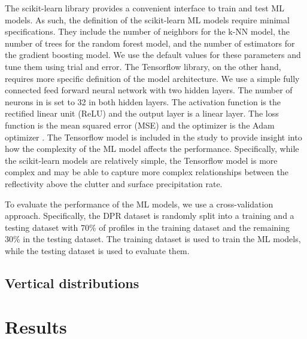 \documentclass{article}
\begin{document}
The scikit-learn library provides a convenient interface to train and
test ML models.  As such, the definition of the scikit-learn ML models
require minimal specifications. They include the number of neighbors
for the k-NN model, the number of trees for the random forest model,
and the number of estimators for the gradient boosting model.  We use
the default values for these parameters and tune them using 
trial and error.  The Tensorflow library, on the other hand, requires
more specific definition of the model architecture.  We use a simple 
fully connected feed forward neural network with two hidden layers. 
The number of neurons in is set to 32 in both hidden layers.  The
activation function is the rectified linear unit (ReLU) \citep{relu2010}
and the output layer is a linear layer.  The loss function is the mean
squared error (MSE) and the optimizer is the Adam optimizer 
\citep{adam2014}. The Tensorflow model is included in the study to
provide insight into how the complexity of the ML model affects the
performance.  Specifically, while the scikit-learn models are relatively
simple, the Tensorflow model is more complex \citep{deepL2016} and may 
be able to capture
more complex relationships between the reflectivity above the
clutter and surface precipitation rate.  

To evaluate the performance of the ML models, we use a cross-validation
approach.  Specifically, the DPR dataset is randomly split into a training and 
a testing dataset with 70\% of profiles in the training dataset and the
remaining 30\% in the testing dataset.  The training dataset is used to 
train the ML models, while the testing dataset is used to evaluate them.


\subsection*{Vertical distributions}

\section*{Results}
\end{document}
